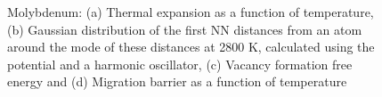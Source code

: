 \documentclass{article}
\begin{document}
\begin{figure}[!htp]
\centering
{}
\hfill
{}
\hfill
\caption{Molybdenum: (a) Thermal expansion as a function of temperature, (b) Gaussian distribution of the first NN distances from an atom around the mode of these distances at 2800 K, calculated using the potential \cite{Zhou2004} and a harmonic oscillator, (c) Vacancy formation free energy and (d) Migration barrier as a function of temperature}
\label{fig:17}
\end{figure}
\end{document}
